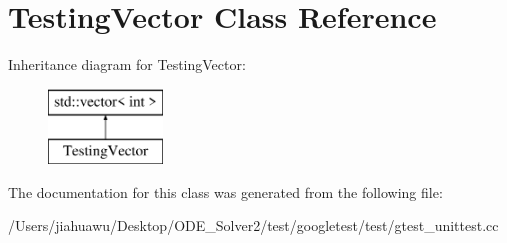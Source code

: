 \hypertarget{class_testing_vector}{}\section{Testing\+Vector Class Reference}
\label{class_testing_vector}
Inheritance diagram for Testing\+Vector\+:\begin{figure}[H]
\begin{center}
\leavevmode
\includegraphics[height=2.000000cm]{class_testing_vector}
\end{center}
\end{figure}


The documentation for this class was generated from the following file\+:\begin{DoxyCompactItemize}
\item 
/\+Users/jiahuawu/\+Desktop/\+O\+D\+E\+\_\+\+Solver2/test/googletest/test/gtest\+\_\+unittest.\+cc\end{DoxyCompactItemize}
